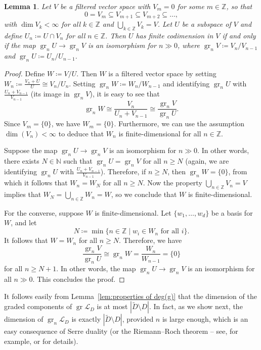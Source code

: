 \documentclass[12pt]{amsart}
\theoremstyle{plain}
\newtheorem{lemma}[theorem]{Lemma}
\theoremstyle{definition}
\numberwithin{equation}{section}
\def\L{\mathcal{L}}
\def\NN{\mathbb{N}}
\def\ZZ{\mathbb{Z}}
\DeclareMathOperator{\gr}{gr}
\begin{document}
\begin{lemma}\label{lem:finite codimension filtration}
    Let $V$ be a filtered vector space with $V_m = 0$ for some $m \in \ZZ$, so that
    $$0 = V_m \subseteq V_{m + 1} \subseteq V_{m + 2} \subseteq \dots,$$
    with $\dim V_k < \infty$ for all $k \in \ZZ$ and $\bigcup_{k \in \ZZ} V_k = V$. Let $U$ be a subspace of $V$ and define $U_n \coloneqq U \cap V_n$ for all $n \in \ZZ$. Then $U$ has finite codimension in $V$ if and only if the map $\gr_n U \to \gr_n V$ is an isomorphism for $n \gg 0$, where $\gr_n V \coloneqq V_n/V_{n - 1}$ and $\gr_n U \coloneqq U_n/U_{n - 1}$.
\end{lemma}
\begin{proof}
   Define $W \coloneqq V/U$. Then $W$ is a filtered vector space by setting $W_n \coloneqq \frac{V_n + U}{U} \cong V_n/U_n$. Setting $\gr_n W \coloneqq W_n/W_{n - 1}$ and identifying $\gr_n U$ with $\frac{U_n + V_{n - 1}}{V_{n - 1}}$ (its image in $\gr_n V$), it is easy to see that
    $$\gr_n W \cong \frac{V_n}{U_n + V_{n - 1}} \cong \frac{\gr_n V}{\gr_n U}.$$
    Since $V_m = \{0\}$, we have $W_m = \{0\}$. Furthermore, we can use the assumption $\dim(V_n) < \infty$ to deduce that $W_n$ is finite-dimensional for all $n \in \ZZ$.

    Suppose the map $\gr_n U \to \gr_n V$ is an isomorphism for $n \gg 0$. In other words, there exists $N \in \NN$ such that $\gr_n U = \gr_n V$ for all $n \geq N$ (again, we are identifying $\gr_n U$ with $\frac{U_n + V_{n - 1}}{V_{n - 1}}$). Therefore, if $n \geq N$, then $\gr_n W = \{0\}$, from which it follows that $W_n = W_N$ for all $n \geq N$. Now the property $\bigcup_{n \in \ZZ} V_n = V$ implies that $W_N = \bigcup_{n \in \ZZ} W_n = W$, so we conclude that $W$ is finite-dimensional.
    
    For the converse, suppose $W$ is finite-dimensional. Let $\{w_1,\dots, w_d\}$ be a basis for $W$, and let
    $$N \coloneqq \min\{n \in \ZZ \mid w_i \in W_n \text{ for all } i\}.$$
    It follows that $W = W_n$ for all $n \geq N$. Therefore, we have
    $$\frac{\gr_n V}{\gr_n U} \cong \gr_n W = \frac{W_n}{W_{n - 1}} = \{0\}$$
    for all $n \geq N + 1$. In other words, the map $\gr_n U \to \gr_n V$ is an isomorphism for all $n \gg 0$. This concludes the proof.
\end{proof}

It follows easily from Lemma~\ref{lem:properties of deg(g)} that the dimension of the graded components of $\gr \L_D$ is at most $|\widetilde{D} \setminus D|$. In fact, as we show next, the dimension of $\gr_n \L_D$ is exactly $|\widetilde{D} \setminus D|$, provided $n$ is large enough, which is an easy consequence of Serre duality (or the Riemann--Roch theorem -- see, for example, \cite[Theorem II.5.4]{Silverman} or \cite[Section 4.1]{Schlichenmaier} for details).
\end{document}
